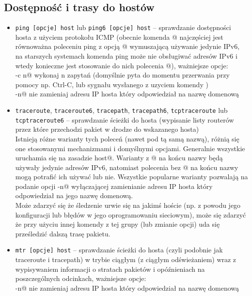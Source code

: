 \subsection{Dostępność i trasy do hostów}
\begin{itemize}
	\item \Verb#ping [opcje] host# lub \Verb#ping6 [opcje] host# –
		sprawdzanie dostępności hosta z użyciem protokołu ICMP
		(obecnie komenda @ najczęściej jest równoważna poleceniu ping z opcją @ wymuszającą używanie jedynie IPv6,
		na starszych systemach komenda ping może nie obsługiwać adresów IPv6 i wtedy konieczne jest stosowanie do nich polecenia @),
		ważniejsze opcje:\\
		\Verb@-c n@ wykonaj n zapytań (domyślnie pyta do momentu przerwania przy pomocy np. Ctrl-C, lub sygnału wysłanego z uzyciem komendy \Verb@kill@)\\
		\Verb@-n@ nie zamieniaj adresu IP hosta który odpowiedział na nazwę domenową
		
	\item \Verb#traceroute#, \Verb#traceroute6#, \Verb#tracepath#, \Verb#tracepath6#, \Verb#tcptraceroute# lub \Verb#tcptraceroute6# – 
		sprawdzanie ścieżki do hosta (wypisanie listy routerów przez które przechodzi pakiet w drodze do wskazanego hosta)\\
		Istnieją różne warianty tych poleceń (nawet pod tą samą nazwą), różnią się one stosowanymi mechanizmami i domyślnymi opcjami.
		Generalnie wszystkie uruchamia się na zasadzie \Verb@polecenie [opcje] host@.
		Warianty z @ na końcu nazwy będą używały jedynie adresów IPv6, natomiast polecenia bez @ na końcu nazwy mogą potrafić ich używać lub nie.
		Wszystkie popularne warianty pozwalają na podanie opcji \Verb@-n@ wyłączającej zamienianie adresu IP hosta który odpowiedział na jego nazwę domenową.\\
		Może zdarzyć się że śledzenie urwie się na jakimś hoście (np. z powodu jego konfiguracji lub błędów w jego oprogramowaniu sieciowym),
		może się zdarzyć że przy użyciu innej komendy z tej grupy (lub zmianie opcji) uda się prześledzić dalszą trasę pakietu.
	\item \Verb#mtr [opcje] host# –
		sprawdzanie ścieżki do hosta (czyli podobnie jak traceroute i tracepath) w trybie ciągłym (z ciągłym odświeżaniem)
		wraz z wypisywaniem informacji o stratach pakietów i opóźnieniach na poszczególnych odcinkach, ważniejsze opcje:\\
		\Verb@-n@ nie zamieniaj adresu IP hosta który odpowiedział na nazwę domenową
	

\end{itemize}
